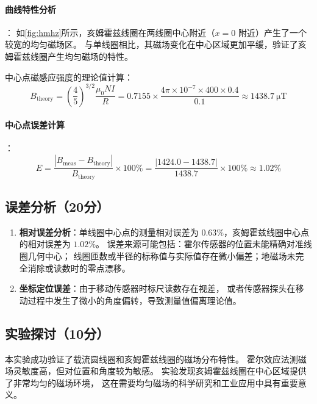 \documentclass{../../templates/Report}%
\begin{document}
\begin{fullreportonly}
    \paragraph{曲线特性分析}：
    如\cref{fig:hmhz}所示，亥姆霍兹线圈在两线圈中心附近（$x=0$ 附近）产生了一个较宽的均匀磁场区。
    与单线圈相比，其磁场变化在中心区域更加平缓，验证了亥姆霍兹线圈产生均匀磁场的特性。

    中心点磁感应强度的理论值计算：
    \begin{equation*}
        B_{\text{theory}} = \left(\frac{4}{5}\right)^{3/2} \frac{\mu_0 N I}{R} = 0.7155 \times \frac{4\pi \times 10^{-7} \times 400 \times 0.4}{0.1} \approx \SI{1438.7}{\micro\tesla}
    \end{equation*}

    \paragraph{中心点误差计算}：
    \begin{equation*}
        E = \frac{|B_{\text{meas}} - B_{\text{theory}}|}{B_{\text{theory}}} \times 100\% = \frac{|1424.0 - 1438.7|}{1438.7} \times 100\% \approx 1.02\%
    \end{equation*}

    \subsection{误差分析（20分）}
    \begin{enumerate}
        \item \textbf{相对误差分析}：单线圈中心点的测量相对误差为 $0.63\%$，亥姆霍兹线圈中心点的相对误差为 $1.02\%$。
              误差来源可能包括：霍尔传感器的位置未能精确对准线圈几何中心；
              线圈匝数或半径的标称值与实际值存在微小偏差；地磁场未完全消除或读数时的零点漂移。
        \item \textbf{坐标定位误差}：由于移动传感器时标尺读数存在视差，
              或者传感器探头在移动过程中发生了微小的角度偏转，导致测量值偏离理论值。
    \end{enumerate}
    \subsection{实验探讨（10分）}
    本实验成功验证了载流圆线圈和亥姆霍兹线圈的磁场分布特性。
    霍尔效应法测磁场灵敏度高，但对位置和角度较为敏感。
    实验发现亥姆霍兹线圈在中心区域提供了非常均匀的磁场环境，
    这在需要均匀磁场的科学研究和工业应用中具有重要意义。


\end{fullreportonly}
\end{document}
